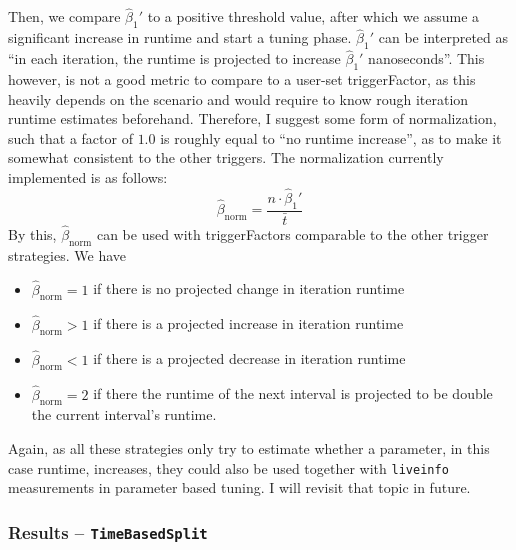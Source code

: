 \documentclass[]{article}
\begin{document}
\begin{enumerate}
	      Then, we compare $\hat\beta_1'$ to a positive threshold value, after which we assume a significant increase in runtime and start a tuning phase. $\hat\beta_1'$ can be interpreted as \enquote{in each iteration, the runtime is projected to increase $\hat\beta_1'$ nanoseconds}. This however, is not a good metric to compare to a user-set triggerFactor, as this heavily depends on the scenario and would require to know rough iteration runtime estimates beforehand. Therefore, I suggest some form of normalization, such that a factor of $1.0$ is roughly equal to \enquote{no runtime increase}, as to make it somewhat consistent to the other triggers. The normalization currently implemented is as follows:
	      \[
		      \hat\beta_{\text{norm}} = \frac{n\cdot\hat\beta_1'}{\bar t}
	      \]
	      By this, $\hat\beta_{\text{norm}}$ can be used with triggerFactors comparable to the other trigger strategies.
	      We have
	      \begin{itemize}
		      \item $\hat\beta_{\text{norm}} = 1$ if there is no projected change in iteration runtime
		      \item $\hat\beta_{\text{norm}} > 1$ if there is a projected increase in iteration runtime
		      \item $\hat\beta_{\text{norm}} < 1$ if there is a projected decrease in iteration runtime
		      \item $\hat\beta_{\text{norm}} = 2$ if there the runtime of the next interval is projected to be double the current interval's runtime.
	      \end{itemize}

\end{enumerate}
Again, as all these strategies only try to estimate whether a parameter, in this case runtime, increases, they could also be used together with \texttt{liveinfo} measurements in parameter based tuning. I will revisit that topic in future.


\subsubsection{Results -- \texttt{TimeBasedSplit}}
\end{document}
